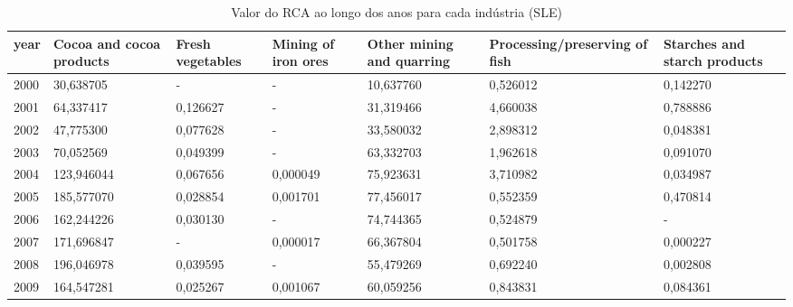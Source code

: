 \begin{table}
\centering
\caption{Valor do RCA ao longo dos anos para cada indústria (SLE)}
\begin{tabular}{p{1cm}p{2cm}p{2cm}p{2cm}p{2cm}p{2cm}p{2cm}}
\toprule
 year &  Cocoa and cocoa products &  Fresh vegetables &  Mining of iron ores &  Other mining and quarring &  Processing/preserving of fish &  Starches and starch products \\
\midrule
 2000 &                 30,638705 &                 - &                    - &                  10,637760 &                       0,526012 &                      0,142270 \\
 2001 &                 64,337417 &          0,126627 &                    - &                  31,319466 &                       4,660038 &                      0,788886 \\
 2002 &                 47,775300 &          0,077628 &                    - &                  33,580032 &                       2,898312 &                      0,048381 \\
 2003 &                 70,052569 &          0,049399 &                    - &                  63,332703 &                       1,962618 &                      0,091070 \\
 2004 &                123,946044 &          0,067656 &             0,000049 &                  75,923631 &                       3,710982 &                      0,034987 \\
 2005 &                185,577070 &          0,028854 &             0,001701 &                  77,456017 &                       0,552359 &                      0,470814 \\
 2006 &                162,244226 &          0,030130 &                    - &                  74,744365 &                       0,524879 &                             - \\
 2007 &                171,696847 &                 - &             0,000017 &                  66,367804 &                       0,501758 &                      0,000227 \\
 2008 &                196,046978 &          0,039595 &                    - &                  55,479269 &                       0,692240 &                      0,002808 \\
 2009 &                164,547281 &          0,025267 &             0,001067 &                  60,059256 &                       0,843831 &                      0,084361 \\

\end{tabular}
\end{table}
